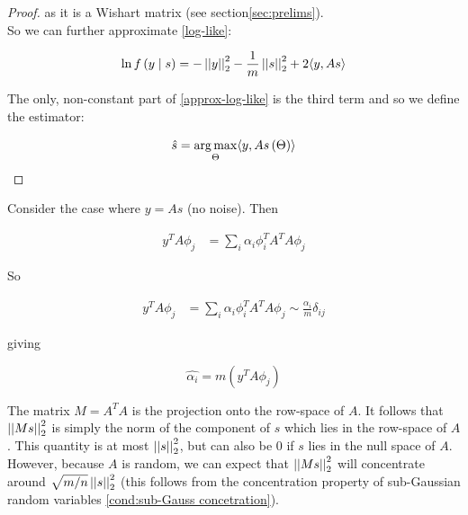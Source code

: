 \documentclass{article}
\begin{document}
\begin{proof}
as it is a Wishart matrix (see section\ref{sec:prelims}). 
\\
So we can further approximate \eqref{log-like}:

\begin{equation}
\ln{f\left(y \mid s\right)}  = - \left|\left|y\right|\right|_2^2 - \frac{1}{m}\left|\left|s\right|\right|_2^2 + 2\langle y, As \rangle
\label{approx-log-like}
\end{equation}

The only, non-constant part of \eqref{approx-log-like} is the third term and so we define the estimator:

\begin{equation}
\hat{s} = \operatorname*{arg\,max}_{\Theta} \langle y , As\left(\Theta\right)\rangle
\label{eq: compressive-estimator}
\end{equation}
\end{proof}

\begin{corollary}
Consider the case where \( y = As\) (no noise). Then

\begin{align*}
y^TA\phi_j &= \sum_i \alpha_i \phi_i^TA^TA\phi_j
\end{align*}



So 


\begin{align*}
y^TA\phi_j &= \sum_i \alpha_i \phi_i^TA^TA\phi_j \sim \frac{\alpha_i}{m} \delta_{ij}
\end{align*}

giving
 
\begin{equation}
\widehat{\alpha_i} = m\left(y^TA\phi_j\right)
\end{equation}
\end{corollary}

\begin{remark}
The matrix \(M = A^TA\) is the projection onto the row-space of \(A\). It follows that \(\left|\left|Ms\right|\right|_2^2\) is simply the norm of the component of \(s\) which lies in the row-space of \(A\). This quantity is at most \(\left|\left|s\right|\right|_2^2\), but can also be \(0\) if \(s\) lies in the null space of \(A\). However, because \(A\) is random, we can expect that \(\left|\left|Ms\right|\right|_2^2\) will concentrate around \(\sqrt{m/n}\left|\left|s\right|\right|_2^2\) (this follows from the concentration property of sub-Gaussian random variables \eqref{cond:sub-Gauss concetration}).
\end{remark}
\end{document}
